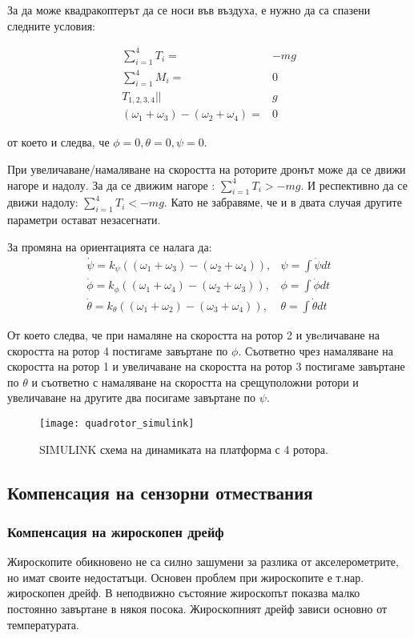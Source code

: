 За да може квадракоптерът да се носи във въздуха, е нужно да са спазени следните условия:

\begin{align}
		\sum_{i=1}^{4} T_i  =& -mg \\
		\sum_{i=1}^{4} M_i  =& 0 \\
		T_{1,2,3,4} ||& g \\
		( \omega_1 + \omega_3 ) - ( \omega_2 + \omega_4 ) =& 0 
\end{align}

от което и следва, че \(\phi=0,\theta=0,\psi=0\).

При увеличаване/намаляване на скоростта на роторите дронът може да се движи нагоре и надолу.
За да се движим нагоре : \(\sum_{i=1}^4 T_i > -mg\).
И респективно да се движи надолу: \(\sum_{i=1}^4 T_i < -mg\). Като не забравяме, 
че и в двата случая другите параметри остават незасегнати.

За промяна на ориентацията се налага да:
\begin{align}
		\dot{\psi} = k_{\psi}((\omega_1+\omega_3)-(\omega_2 + \omega_4)) ,& \psi = \int \dot{\psi}dt\\
		\dot{\phi} = k_{\phi}((\omega_1 + \omega_4) - (\omega_2+\omega_3 )) ,& \phi = \int \dot{\phi}dt\\
		\dot{\theta} = k_{\theta}((\omega_1+\omega_2) - (\omega_3 +\omega_4)) ,& \theta = \int \dot{\theta}dt
\end{align}


От което следва, че при намаляне на скоростта на ротор 2 и увeличаване на скоростта на ротор 4 постигаме
завъртане по \(\phi\). Съответно чрез намаляване на скоростта на ротор 1 и увеличаване на скоростта на ротор 3 
постигаме завъртане по \(\theta\)  и съответно с намаляване на скоростта на срещуположни ротори и увеличаване на другите два посигаме завъртане по \(\psi\).

\begin{figure}[!h]
    \centering
    \texttt{[image: quadrotor\_simulink]}
    \caption{SIMULINK схема на динамиката на платформа с 4 ротора.}
    \label{fig:quadrotor_simulink}
\end{figure}


\FloatBarrier


\subsection{Компенсация на сензорни отмествания}

\subsubsection{Компенсация на жироскопен дрейф}
\FloatBarrier
Жироскопите обикновено не са силно зашумени за разлика от
акселерометрите, но имат своите недостатъци.
Основен проблем при жироскопите е т.нар. жироскопен дрейф.
В неподвижно състояние жироскопът показва малко постоянно завъртане в някоя посока.
Жироскопният дрейф зависи основно от температурата.

